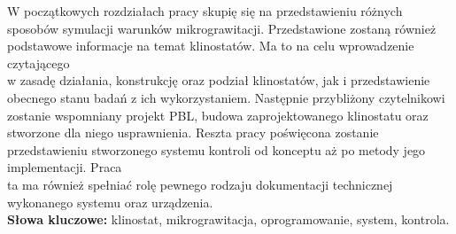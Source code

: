 W początkowych rozdziałach pracy skupię się na przedstawieniu różnych sposobów symulacji warunków mikrograwitacji. Przedstawione zostaną również podstawowe informacje na temat
 klinostatów. Ma to na celu wprowadzenie czytającego \\w zasadę działania, konstrukcję oraz
  podział klinostatów, jak i przedstawienie obecnego stanu badań z ich wykorzystaniem. Następnie przybliżony czytelnikowi zostanie wspomniany projekt PBL, budowa zaprojektowanego klinostatu oraz stworzone dla niego usprawnienia. Reszta pracy poświęcona zostanie przedstawieniu stworzonego systemu kontroli od konceptu aż po metody jego implementacji. Praca \\ta ma również spełniać rolę pewnego rodzaju dokumentacji technicznej wykonanego systemu oraz urządzenia.\\
  

{\bf Słowa kluczowe:} klinostat, mikrograwitacja, oprogramowanie, system, kontrola.

